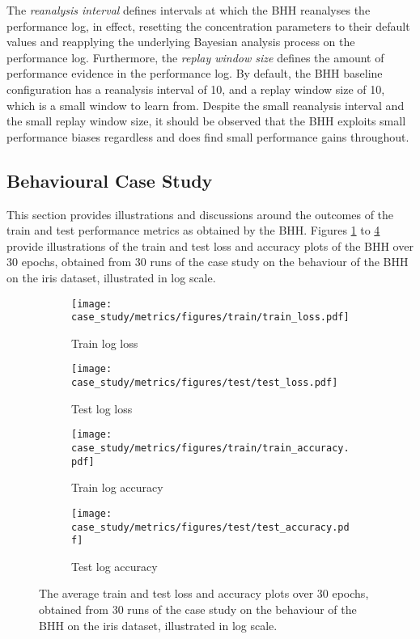 The \textit{reanalysis interval} defines intervals at which the \acs{BHH} reanalyses the performance log, in effect, resetting the concentration parameters to their default values and reapplying the underlying Bayesian analysis process on the performance log. Furthermore, the \textit{replay window size} defines the amount of performance evidence in the performance log. By default, the \acs{BHH} baseline configuration has a reanalysis interval of 10, and a replay window size of 10, which is a small window to learn from. Despite the small reanalysis interval and the small replay window size, it should be observed that the \acs{BHH} exploits small performance biases regardless and does find small performance gains throughout.

\subsection{Behavioural Case Study}\label{sec:results:case_study}


This section provides illustrations and discussions around the outcomes of the train and test performance metrics as obtained by the \acs{BHH}. Figures \ref{fig:results:case_study:metrics:train_loss} to \ref{fig:results:case_study:metrics:test_accuracy} provide illustrations of the train and test loss and accuracy plots of the \acs{BHH} over 30 epochs, obtained from 30 runs of the case study on the behaviour of the \acs{BHH} on the iris dataset, illustrated in log scale.

\begin{figure}[htb]
	\begin{subfigure}{0.5\textwidth}
		\centering
		\texttt{[image: case\_study/metrics/figures/train/train\_loss.pdf]}
		\caption{Train log loss}
		\label{fig:results:case_study:metrics:train_loss}
	\end{subfigure}
	\begin{subfigure}{0.5\textwidth}
		\centering
		\texttt{[image: case\_study/metrics/figures/test/test\_loss.pdf]}
		\caption{Test log loss}
		\label{fig:results:case_study:metrics:test_loss}
	\end{subfigure}
	\par\bigskip
	\begin{subfigure}{0.5\textwidth}
		\centering
		\texttt{[image: case\_study/metrics/figures/train/train\_accuracy.pdf]}
		\caption{Train log accuracy}
		\label{fig:results:case_study:metrics:train_accuracy}
	\end{subfigure}
	\begin{subfigure}{0.5\textwidth}
		\centering
		\texttt{[image: case\_study/metrics/figures/test/test\_accuracy.pdf]}
		\caption{Test log accuracy}
		\label{fig:results:case_study:metrics:test_accuracy}
	\end{subfigure}
	\par\bigskip
	\caption{The average train and test loss and accuracy plots over 30 epochs, obtained from 30 runs of the case study on the behaviour of the \acs{BHH} on the iris dataset, illustrated in log scale.}
	\label{fig:results:case_study:metrics}
\end{figure}

